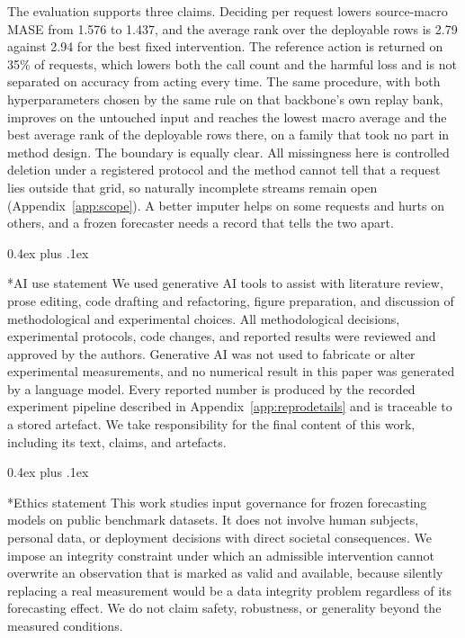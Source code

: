 \documentclass{article}
\makeatletter
\def\subsubsection{\@startsection{subsubsection}{3}{\z@}{-1.2ex plus -0.4ex minus -.2ex}%
  {0.4ex plus .1ex}{\normalsize\sc\raggedright}}
\makeatother
\begin{document}
The evaluation supports three claims. Deciding per request lowers source-macro MASE from 1.576 to 1.437, and the average rank over the deployable rows is 2.79 against 2.94 for the best fixed intervention. The reference action is returned on 35\% of requests, which lowers both the call count and the harmful loss and is not separated on accuracy from acting every time. The same procedure, with both hyperparameters chosen by the same rule on that backbone's own replay bank, improves on the untouched input and reaches the lowest macro average and the best average rank of the deployable rows there, on a family that took no part in method design.
The boundary is equally clear. All missingness here is controlled deletion under a registered
protocol and the method cannot tell that a request lies outside that grid, so naturally
incomplete streams remain open (Appendix~\ref{app:scope}). A better imputer helps on some requests and hurts on others, and a frozen forecaster needs a record that tells the two apart.

\subsubsection*{AI use statement}
We used generative AI tools to assist with literature review, prose editing, code drafting and
refactoring, figure preparation, and discussion of methodological and experimental choices.
All methodological decisions, experimental protocols, code changes, and reported results were
reviewed and approved by the authors. Generative AI was not used to fabricate or alter
experimental measurements, and no numerical result in this paper was generated by a language
model. Every reported number is produced by the recorded experiment pipeline described in
Appendix~\ref{app:reprodetails} and is traceable to a stored artefact. We take responsibility
for the final content of this work, including its text, claims, and artefacts.

\subsubsection*{Ethics statement}
This work studies input governance for frozen forecasting models on public benchmark datasets.
It does not involve human subjects, personal data, or deployment decisions with direct
societal consequences. We impose an integrity constraint under which an admissible
intervention cannot overwrite an observation that is marked as valid and available, because
silently replacing a real measurement would be a data integrity problem regardless of its
forecasting effect. We do not claim safety, robustness, or generality beyond the measured
conditions.
\end{document}
